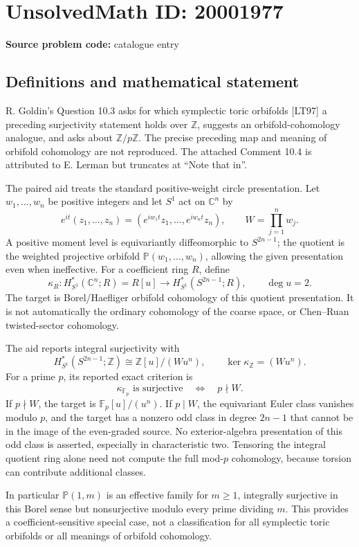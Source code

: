 \documentclass[11pt]{article}
\begin{document}
\section*{UnsolvedMath ID: 20001977}
\textbf{Source problem code:} catalogue entry
\subsection{Definitions and mathematical statement}
R. Goldin's Question 10.3 asks for which symplectic toric orbifolds [LT97] a preceding surjectivity statement holds over \(\mathbb Z\), suggests an orbifold-cohomology analogue, and asks about \(\mathbb Z/p\mathbb Z\). The precise preceding map and meaning of orbifold cohomology are not reproduced. The attached Comment 10.4 is attributed to E. Lerman but truncates at ``Note that in''.

The paired aid treats the standard positive-weight circle presentation. Let \(w_1,\ldots,w_n\) be positive integers and let \(S^1\) act on \(\mathbb C^n\) by
\[
 e^{it}(z_1,\ldots,z_n)=(e^{iw_1t}z_1,\ldots,e^{iw_nt}z_n),
 \qquad W=\prod_{j=1}^n w_j.
\]
A positive moment level is equivariantly diffeomorphic to \(S^{2n-1}\); the quotient is the weighted projective orbifold \(\mathbb P(w_1,\ldots,w_n)\), allowing the given presentation even when ineffective. For a coefficient ring \(R\), define
\[
 \kappa_R:H^*_{S^1}(\mathbb C^n;R)=R[u]
       \longrightarrow H^*_{S^1}(S^{2n-1};R),\qquad \deg u=2.
\]
The target is Borel/Haefliger orbifold cohomology of this quotient presentation. It is not automatically the ordinary cohomology of the coarse space, or Chen--Ruan twisted-sector cohomology.

The aid reports integral surjectivity with
\[
 H^*_{S^1}(S^{2n-1};\mathbb Z)
 \cong\mathbb Z[u]/(Wu^n),\qquad
 \ker\kappa_{\mathbb Z}=(Wu^n).
\]
For a prime \(p\), its reported exact criterion is
\[
 \kappa_{\mathbb F_p}\text{ is surjective}
 \quad\Longleftrightarrow\quad p\nmid W.
\]
If \(p\nmid W\), the target is \(\mathbb F_p[u]/(u^n)\). If \(p\mid W\), the equivariant Euler class vanishes modulo \(p\), and the target has a nonzero odd class in degree \(2n-1\) that cannot be in the image of the even-graded source. No exterior-algebra presentation of this odd class is asserted, especially in characteristic two. Tensoring the integral quotient ring alone need not compute the full mod-\(p\) cohomology, because torsion can contribute additional classes.

In particular \(\mathbb P(1,m)\) is an effective family for \(m\geq1\), integrally surjective in this Borel sense but nonsurjective modulo every prime dividing \(m\). This provides a coefficient-sensitive special case, not a classification for all symplectic toric orbifolds or all meanings of orbifold cohomology.
\end{document}
